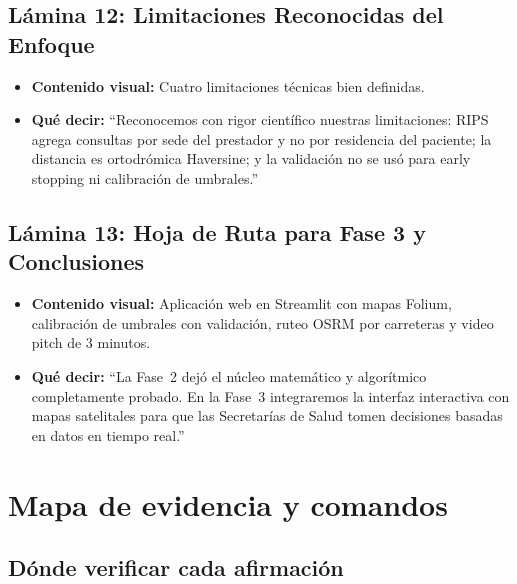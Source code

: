 \documentclass[11pt,a4paper]{article}
\begin{document}
\subsection{Lámina 12: Limitaciones Reconocidas del Enfoque}
\begin{itemize}[leftmargin=*]
  \item \textbf{Contenido visual:} Cuatro limitaciones técnicas bien definidas.
  \item \textbf{Qué decir:} ``Reconocemos con rigor científico nuestras limitaciones: RIPS agrega consultas por sede del prestador y no por residencia del paciente; la distancia es ortodrómica Haversine; y la validación no se usó para early stopping ni calibración de umbrales.''
\end{itemize}

\subsection{Lámina 13: Hoja de Ruta para Fase 3 y Conclusiones}
\begin{itemize}[leftmargin=*]
  \item \textbf{Contenido visual:} Aplicación web en Streamlit con mapas Folium, calibración de umbrales con validación, ruteo OSRM por carreteras y video pitch de 3 minutos.
  \item \textbf{Qué decir:} ``La Fase~2 dejó el núcleo matemático y algorítmico completamente probado. En la Fase~3 integraremos la interfaz interactiva con mapas satelitales para que las Secretarías de Salud tomen decisiones basadas en datos en tiempo real.''
\end{itemize}

\section{Mapa de evidencia y comandos}

\subsection{Dónde verificar cada afirmación}
\end{document}
